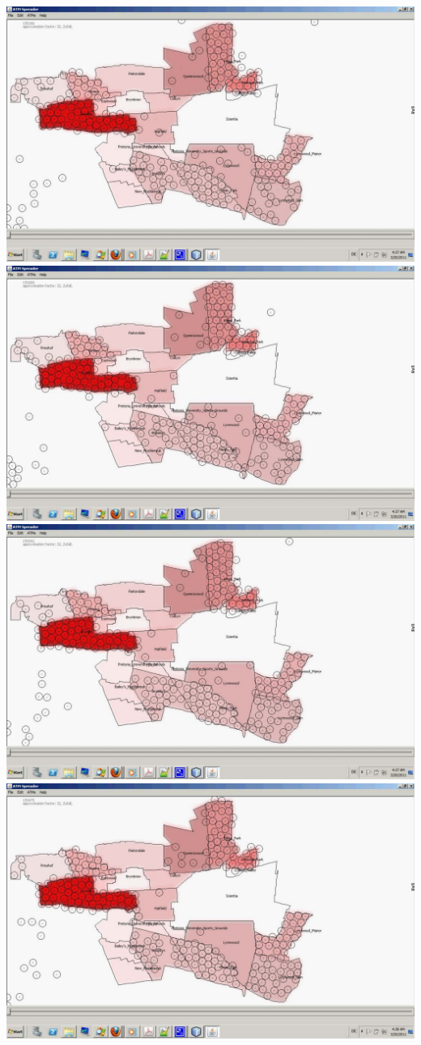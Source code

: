 \documentclass[12pt,a4paper]{article}
\begin{document}
\includegraphics[width=1.0\textwidth]{8.pdf}
\includegraphics[width=1.0\textwidth]{9.pdf}
\includegraphics[width=1.0\textwidth]{10.pdf}
\includegraphics[width=1.0\textwidth]{11.pdf}
\end{document}
